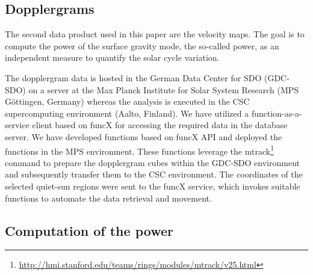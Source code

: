 \documentclass{aa}
\begin{document}
\subsection{Dopplergrams}

The second data product used in this paper are the \los{} velocity maps. The goal is to compute the power of the surface gravity mode, the so-called \fff power, as an independent measure to quantify the solar cycle variation.

The dopplergram data is hosted in the German Data Center for SDO (GDC-SDO) on a server at the Max Planck Institute for Solar System Research (MPS Göttingen, Germany) whereas the analysis is executed in the CSC supercomputing environment (Aalto, Finland). We have utilized  a function-as-a-service client based on funcX \cite[]{chard20funcx} for accessing the required data in the database server. We have developed functions based on funcX API and deployed the functions in the MPS environment. These functions leverage the mtrack\footnote{\url{http://hmi.stanford.edu/teams/rings/modules/mtrack/v25.html}} command to prepare the dopplergram cubes within the GDC-SDO environment and subsequently transfer them to the CSC environment. The coordinates of the selected quiet-sun regions were sent to the funcX service, which invokes suitable functions to automate the data retrieval and movement.


%
\subsection{Computation of the \fff power}
\end{document}

